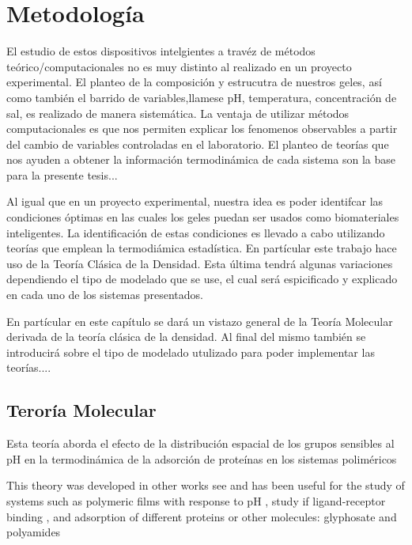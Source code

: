 \chapter{Metodolog\'ia}
\label{Metodologia}

El estudio de estos dispositivos intelgientes a trav\'ez de m\'etodos te\'orico/computacionales no es muy distinto al realizado en un proyecto experimental. El planteo de la composici\'on y estrucutra de nuestros geles, as\'i como tambi\'en el barrido de variables,llamese pH, temperatura, concentraci\'on de sal, es realizado de manera sistem\'atica.
La ventaja de utilizar m\'etodos computacionales es que nos permiten explicar los fenomenos observables a partir del cambio de variables controladas en el laboratorio.
El planteo de teor\'ias que nos ayuden a obtener la informaci\'on termodin\'amica de cada sistema son la base para la presente tesis... 


Al igual que en un proyecto experimental, nuestra idea es poder identifcar las condiciones \'optimas en las cuales los geles puedan ser usados como biomateriales inteligentes. 
La identificaci\'on de estas condiciones es llevado a cabo utilizando teor\'ias que emplean la termodi\'amica estad\'istica. En part\'icular este trabajo hace uso de la Teor\'ia Cl\'asica de la Densidad. Esta \'ultima tendr\'a algunas variaciones dependiendo el tipo de modelado que se use, el cual ser\'a espicificado y explicado en cada uno de los sistemas presentados.

En part\'icular en este cap\'itulo se dar\'a un vistazo general de la Teor\'ia Molecular derivada de la teor\'ia cl\'asica de la densidad. 
Al final del mismo tambi\'en se introducir\'a sobre el tipo de modelado utulizado para poder implementar las teor\'ias....
 

\section{Teror\'ia Molecular}


Esta teor\'ia aborda el efecto de la distribución espacial de los grupos sensibles al pH en la termodinámica de la adsorción de proteínas en los sistemas poliméricos


This theory was developed in other works see  and has been useful for the study of systems such as polymeric films with response to pH , study if ligand-receptor binding , and adsorption of different proteins  or other molecules: glyphosate and polyamides 



